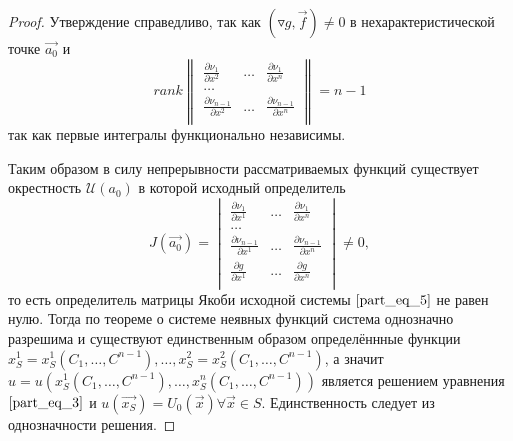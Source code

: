 \documentclass[a4paper, 12pt]{article}
\begin{document}
\begin{proof}
        Утверждение справедливо, так как $ \left( \triangledown g, \overrightarrow{f} \right) \neq 0$ в нехарактеристической точке $\overrightarrow{a_0}$ и
        \begin{equation*}
            rank
            \begin{Vmatrix}
                \frac{\partial \nu_1}{\partial x^2} & \dots & \frac{\partial \nu_1}{\partial x^n}             \\
                \dots                                                                                         \\
                \frac{\partial \nu_{n - 1}}{\partial x^2} & \dots & \frac{\partial \nu_{n - 1}}{\partial x^n} \\
            \end{Vmatrix} = n - 1
        \end{equation*}
        так как первые интегралы функционально независимы.

        Таким образом в силу непрерывности рассматриваемых функций существует окрестность $\mathcal{U} \left( a_0 \right)$ в которой исходный определитель
        \begin{equation*}
            J \left( \overrightarrow{a_0} \right) =
            \begin{vmatrix}
                \frac{\partial \nu_1}{\partial x^1} & \dots & \frac{\partial \nu_1}{\partial x^n}             \\
                \dots                                                                                         \\
                \frac{\partial \nu_{n - 1}}{\partial x^1} & \dots & \frac{\partial \nu_{n - 1}}{\partial x^n} \\
                \frac{\partial g}{\partial x^1} & \dots & \frac{\partial g}{\partial x^n}                     \\
            \end{vmatrix} \neq 0,
        \end{equation*}
        то есть определитель матрицы Якоби исходной системы $\eqref{part_eq_5}$ не равен нулю. Тогда по теореме о системе неявных функций система однозначно разрешима и существуют единственным образом определённные функции $x^1_S = x^1_S \left( C_1, \dots, C^{n - 1} \right), \dots, x^2_S = x^2_S \left( C_1, \dots, C^{n - 1} \right)$, а значит $u = u \left( x^1_S \left( C_1, \dots, C^{n - 1} \right), \dots, x^n_S \left( C_1, \dots, C^{n - 1} \right) \right)$ является решением уравнения $\eqref{part_eq_3}$ и $u \left( \overrightarrow{x_S} \right) = U_0 \left( \overrightarrow{x} \right) \forall \overrightarrow{x} \in S$. Единственность следует из однозначности решения.

    \end{proof}
\end{document}
